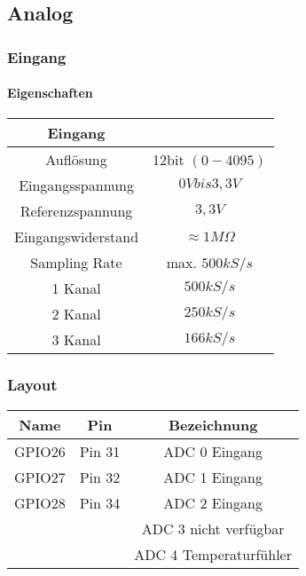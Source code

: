 \documentclass[a4paper,12pt,twoside]{article}
\begin{document}
\subsection{Analog}
\subsubsection{Eingang}
\paragraph{Eigenschaften}
\begin{center}
	\begin{tabular}{|c|c|}
		\hline
		Eingang            &                     \\
		\hline
		\hline
		Auflösung          & 12bit $(0-4095)$    \\
		\hline
		Eingangsspannung   & $0V bis 3,3V$       \\
		\hline
		Referenzspannung   & $3,3V$              \\
		\hline
		Eingangswiderstand & $\approx 1M \Omega$ \\
		\hline
		Sampling Rate      & max. $500kS/s$      \\
		\hline
		1 Kanal            & $500kS/s$           \\
		\hline
		2 Kanal            & $250kS/s$           \\
		\hline
		3 Kanal            & $166kS/s$           \\
		\hline
	\end{tabular}
\end{center}
\subsubsection{Layout}
\begin{center}
	\begin{tabular}{|c|c|c|}
		\hline
		Name   & Pin    & Bezeichnung            \\
		\hline
		\hline
		GPIO26 & Pin 31 & ADC 0 Eingang          \\
		\hline
		GPIO27 & Pin 32 & ADC 1 Eingang          \\
		\hline
		GPIO28 & Pin 34 & ADC 2 Eingang          \\
		\hline
		       &        & ADC 3 nicht verfügbar  \\
		\hline
		       &        & ADC 4 Temperaturfühler \\
		\hline
	\end{tabular}
\end{center}
\end{document}
